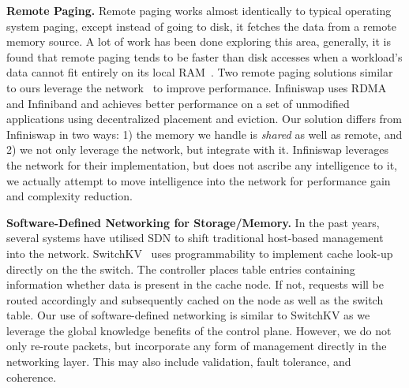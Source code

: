 
\textbf{Remote Paging.}
Remote paging works almost identically to typical operating system paging, except instead of going to disk, it fetches the data from a remote memory source. A lot of work has been done exploring this area, generally, it is found that remote paging tends to be faster than disk accesses when a workload's data cannot fit entirely on its local RAM~\cite{infiniswap}. Two remote paging solutions similar to ours leverage the network~\cite{infiniswap, Liang2005} to improve performance. Infiniswap uses RDMA and Infiniband and achieves better performance on a set of unmodified applications using decentralized placement and eviction. Our solution differs from Infiniswap in two ways: 1) the memory we handle is \textit{shared} as well as remote, and 2) we not only leverage the network, but integrate with it. Infiniswap leverages the network for their implementation, but does not ascribe any intelligence to it, we actually attempt to move intelligence into the network for performance gain and complexity reduction.  

\textbf{Software-Defined Networking for Storage/Memory.}
In the past years, several systems have utilised SDN to shift traditional host-based management into the network. SwitchKV~\cite{switchkv} uses programmability to implement cache look-up directly on the the switch. The controller places table entries containing information whether data is present in the cache node. If not, requests will be routed accordingly and subsequently cached on the node as well as the switch table.
Our use of software-defined networking is similar to SwitchKV as we leverage the global knowledge benefits of the control plane. However, we do not only re-route packets, but incorporate any form of management directly in the networking layer. This may also include validation, fault tolerance, and coherence.